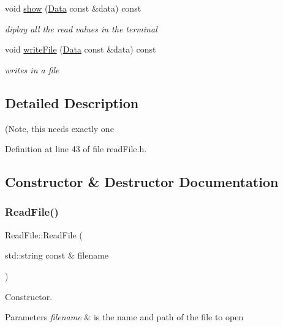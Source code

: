 \begin{DoxyCompactItemize}
void \mbox{\hyperlink{class_read_file_a0ac546e0980ee76612480df922728880}{show}} (\mbox{\hyperlink{struct_data}{Data}} const \&data) const
\begin{DoxyCompactList}\small\item\em diplay all the read values in the terminal \end{DoxyCompactList}\item 
void \mbox{\hyperlink{class_read_file_ab66909fd861779f01fde0e11aef0b77b}{write\+File}} (\mbox{\hyperlink{struct_data}{Data}} const \&data) const
\begin{DoxyCompactList}\small\item\em writes in a file \end{DoxyCompactList}\end{DoxyCompactItemize}


\subsection{Detailed Description}
(Note, this needs exactly one 

Definition at line 43 of file read\+File.\+h.



\subsection{Constructor \& Destructor Documentation}
\mbox{\label{class_read_file_ae297f0539380fc9b703a1bceda2ce820}} 
\subsubsection{\texorpdfstring{Read\+File()}{ReadFile()}}
{\footnotesize\ttfamily Read\+File\+::\+Read\+File (\begin{DoxyParamCaption}\item[{std\+::string const \&}]{filename }\end{DoxyParamCaption})\hspace{0.3cm}{\ttfamily [explicit]}}



Constructor. 


\begin{DoxyParams}{Parameters}
{\em filename} & is the name and path of the file to open \\
\hline
\end{DoxyParams}


